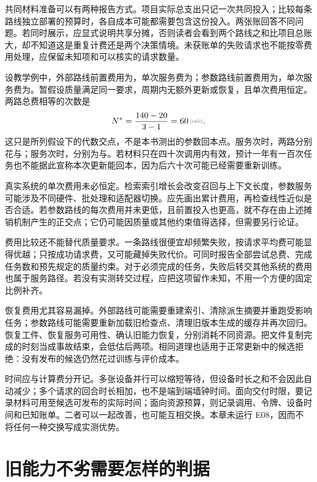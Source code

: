 共同材料准备可以有两种报告方式。项目实际总支出只记一次共同投入；比较每条路线独立部署的预算时，各自成本可能都需要包含这份投入。两张账回答不同问题。若同时展示，应显式说明共享分摊，否则读者会看到两个路线之和比项目总账大，却不知道这是重复计费还是两个决策情境。未获账单的失败请求也不能按零费用处理，应保留未知项和可以核实的请求数量。

设教学例中，外部路线前置费用为，单次服务费为；参数路线前置费用为，单次服务费为。暂假设质量满足同一要求，周期内无额外更新或恢复，且单次费用恒定。两路总费相等的次数是
\begin{equation}
 N^*=\frac{140-20}{3-1}=\calcnum{60}.
\end{equation}
这只是所列假设下的代数交点，不是本书测出的参数回本点。服务次时，两路分别花与；服务次时，分别为与。若材料只在四十次调用内有效，预计一年有一百次任务也不能据此宣称本次更新能回本，因为后六十次可能已经需要重新训练。

真实系统的单次费用未必恒定。检索索引增长会改变召回与上下文长度，参数服务可能涉及不同硬件、批处理和适配器切换。应先画出累计费用，再检查线性近似是否合适。若参数路线的每次费用并未更低，且前置投入也更高，就不存在由上述摊销机制产生的正交点；它仍可能因质量或其他约束值得选择，但需要另行论证。

费用比较还不能替代质量要求。一条路线很便宜却频繁失败，按请求平均费可能显得优越；只按成功请求费，又可能藏掉失败代价。可同时报告全部尝试总费、完成任务数和预先规定的质量约束。对于必须完成的任务，失败后转交其他系统的费用也属于服务路径。若没有实测转交过程，应把这项留作未知，不用一个方便的固定比例补齐。

恢复费用尤其容易漏掉。外部路线可能需要重建索引、清除派生摘要并重跑受影响任务；参数路线可能需要重新加载旧检查点、清理旧版本生成的缓存并再次回归。恢复工件、恢复服务可用性、确认旧能力恢复，分别消耗不同资源。把文件复制完成的时刻当成事故结束，会低估后两项。相同道理也适用于正常更新中的候选拒绝：没有发布的候选仍然花过训练与评价成本。

时间应与计算费分开记。多张设备并行可以缩短等待，但设备时长之和不会因此自动减少；多个请求的回合时长相加，也不是端到端墙钟时间。面向交付时限，要记录材料可用至候选可发布的实际时间；面向资源预算，则记录调用、令牌、设备时间和已知账单。二者可以一起改善，也可能互相交换。本章未运行 E08，因而不将任何一种交换写成实测优势。

\section{旧能力不劣需要怎样的判据}
\label{sec:ch10-noninferiority}

